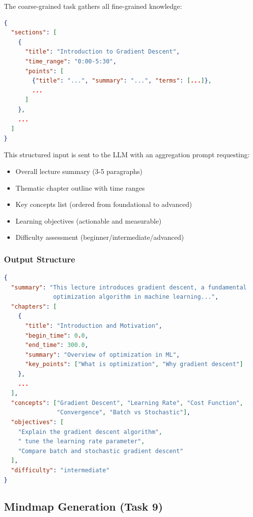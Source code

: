 \documentclass[12pt,a4paper]{article}
\begin{document}
The coarse-grained task gathers all fine-grained knowledge:

\begin{lstlisting}[language=json, caption={Input to Coarse-Grained Task}]
{
  "sections": [
    {
      "title": "Introduction to Gradient Descent",
      "time_range": "0:00-5:30",
      "points": [
        {"title": "...", "summary": "...", "terms": [...]},
        ...
      ]
    },
    ...
  ]
}
\end{lstlisting}

This structured input is sent to the LLM with an aggregation prompt requesting:

\begin{itemize}
    \item Overall lecture summary (3-5 paragraphs)
    \item Thematic chapter outline with time ranges
    \item Key concepts list (ordered from foundational to advanced)
    \item Learning objectives (actionable and measurable)
    \item Difficulty assessment (beginner/intermediate/advanced)
\end{itemize}

\subsubsection{Output Structure}

\begin{lstlisting}[language=json, caption={Coarse-Grained Summary Output}]
{
  "summary": "This lecture introduces gradient descent, a fundamental 
              optimization algorithm in machine learning...",
  "chapters": [
    {
      "title": "Introduction and Motivation",
      "begin_time": 0.0,
      "end_time": 300.0,
      "summary": "Overview of optimization in ML",
      "key_points": ["What is optimization", "Why gradient descent"]
    },
    ...
  ],
  "concepts": ["Gradient Descent", "Learning Rate", "Cost Function", 
               "Convergence", "Batch vs Stochastic"],
  "objectives": [
    "Explain the gradient descent algorithm",
    " tune the learning rate parameter",
    "Compare batch and stochastic gradient descent"
  ],
  "difficulty": "intermediate"
}
\end{lstlisting}

\subsection{Mindmap Generation (Task 9)}
\end{document}
